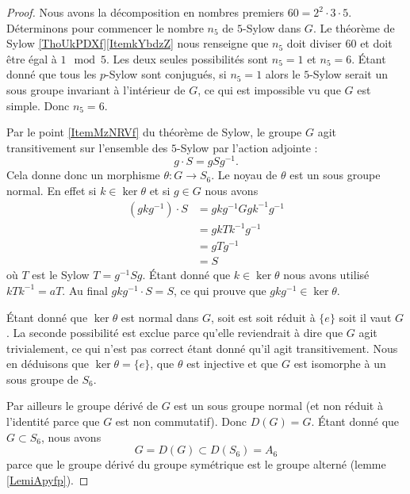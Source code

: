 \begin{proof}
    Nous avons la décomposition en nombres premiers \( 60=2^2\cdot 3\cdot 5\). Déterminons pour commencer le nombre \( n_5\) de \( 5\)-Sylow dans \( G\). Le théorème de Sylow \ref{ThoUkPDXf}\ref{ItemkYbdzZ} nous renseigne que \( n_5\) doit diviser \( 60\) et doit être égal à \( 1\mod 5\). Les deux seules possibilités sont \( n_5=1\) et \( n_5=6\). Étant donné que tous les \( p\)-Sylow sont conjugués, si \( n_5=1\) alors le \( 5\)-Sylow serait un sous groupe invariant à l'intérieur de $G$, ce qui est impossible vu que \( G\) est simple. Donc \( n_5=6\).

    Par le point \ref{ItemMzNRVf} du théorème de Sylow, le groupe \( G\) agit transitivement sur l'ensemble des \( 5\)-Sylow par l'action adjointe :
    \begin{equation}
        g\cdot S=gSg^{-1}.
    \end{equation}
    Cela donne donc un morphisme \( \theta\colon G\to S_6\). Le noyau de \( \theta\) est un sous groupe normal. En effet si \( k\in \ker\theta\) et si \( g\in G\) nous avons
    \begin{subequations}
        \begin{align}
            (gkg^{-1})\cdot S&=gkg^{-1} Ggk^{-1}g^{-1}\\
            &=gkTk^{-1}g^{-1}\\
            &=gTg^{-1}\\
            &=S
        \end{align}
    \end{subequations}
    où \( T\) est le Sylow \( T=g^{-1}Sg\). Étant donné que \( k\in \ker\theta\) nous avons utilisé \( kTk^{-1}=aT\). Au final \( gkg^{-1}\cdot S=S\), ce qui prouve que \( gkg^{-1} \in\ker\theta\).

    Étant donné que \( \ker\theta\) est normal dans \( G\), soit est soit réduit à \( \{ e \}\) soit il vaut \( G\). La seconde possibilité est exclue parce qu'elle reviendrait à dire que \( G\) agit trivialement, ce qui n'est pas correct étant donné qu'il agit transitivement. Nous en déduisons que \( \ker\theta=\{ e \}\), que \( \theta\) est injective et que \( G\) est isomorphe à un sous groupe de \( S_6\).

    Par ailleurs le groupe dérivé de \( G\) est un sous groupe normal (et non réduit à l'identité parce que \( G\) est non commutatif). Donc \( D(G)=G\). Étant donné que \( G\subset S_6\), nous avons
    \begin{equation}
        G=D(G)\subset D(S_6)=A_6
    \end{equation}
    parce que le groupe dérivé du groupe symétrique est le groupe alterné (lemme \ref{LemiApyfp}).


\end{proof}
